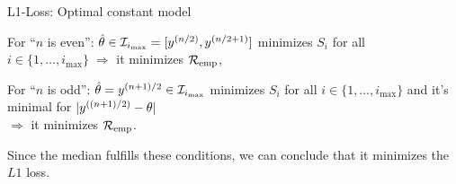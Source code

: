\documentclass[11pt,compress,t,notes=noshow, xcolor=table]{beamer}
\begin{document}
\begin{framei}[sep=L]{L1-Loss: Optimal constant model}
  \item For \enquote{$n$ is even}: $\thetah \in  \mathcal{I}_{i_{\max}} = [y^{(n/2)},y^{(n/2+1)}]$ minimizes $S_i$ for all $i \in \{1,\dots, i_{\max}\} \; \Rightarrow$  it minimizes $\riske$,
  \item For \enquote{$n$ is odd}: $\thetah = y^{(n+1)/2} \in \mathcal{I}_{i_{\max}}$ minimizes $S_i$ for all $i \in \{1,\dots, i_{\max}\}$ and it's minimal for
  $|\yi[(n + 1)/2] - \theta|$ \\ $\Rightarrow$
  it minimizes $\riske$.
  \item Since the median fulfills these conditions, we can conclude that it minimizes 
  the $L1$ loss.

% 
% 




% 
% 


\end{framei}




%   
% 


\endlecture
\end{document}
